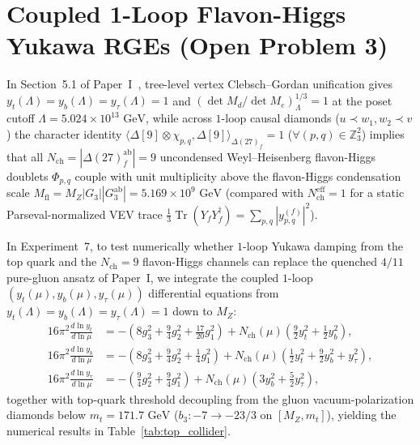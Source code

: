 \documentclass[11pt,a4paper]{article}
\theoremstyle{definition}
\theoremstyle{remark}
\newcommand{\Z}{\mathbb{Z}}
\newcommand{\Tr}{\operatorname{Tr}}
\newcommand{\Gthree}{G_3}
\begin{document}
\section{Coupled 1-Loop Flavon-Higgs Yukawa RGEs (Open Problem 3)}
\label{sec:top_collider}

In Section~5.1 of Paper~I~\cite{PaperI}, tree-level vertex Clebsch--Gordan unification gives $y_t(\Lambda) = y_b(\Lambda) = y_\tau(\Lambda) = 1$ and $(\det M_d/\det M_e)_\Lambda^{1/3} = 1$ at the poset cutoff $\Lambda = 5.024 \times 10^{13}\text{ GeV}$, while across $1$-loop causal diamonds ($u \prec w_1, w_2 \prec v$) the character identity $\langle \Delta[9] \otimes \chi_{p,q}, \Delta[9]\rangle_{\Delta(27)_f} = 1$ ($\forall (p, q) \in \Z_3^2$) implies that all $N_{\mathrm{ch}} = |\Delta(27)_f^{\mathrm{ab}}| = 9$ uncondensed Weyl--Heisenberg flavon-Higgs doublets $\Phi_{p,q}$ couple with unit multiplicity above the flavon-Higgs condensation scale $M_{\mathrm{fl}} = M_Z |\Gthree| |\Gthree^{\mathrm{ab}}| = 5.169 \times 10^9\text{ GeV}$ (compared with $N_{\mathrm{ch}}^{\mathrm{eff}} = 1$ for a static Parseval-normalized VEV trace $\frac{1}{3}\Tr(Y_f Y_f^\dagger) = \sum_{p,q}|y_{p,q}^{(f)}|^2$).

In Experiment~7, to test numerically whether $1$-loop Yukawa damping from the top quark and the $N_{\mathrm{ch}} = 9$ flavon-Higgs channels can replace the quenched $4/11$ pure-gluon ansatz of Paper~I, we integrate the coupled $1$-loop $(y_t(\mu), y_b(\mu), y_\tau(\mu))$ differential equations from $y_t(\Lambda) = y_b(\Lambda) = y_\tau(\Lambda) = 1$ down to $M_Z$:
\begin{equation}
\label{eq:rde_9channel_rge}
\begin{aligned}
16\pi^2 \frac{d\ln y_t}{d\ln\mu} &= -\!\left(8g_3^2 + \frac{9}{4}g_2^2 + \frac{17}{20}g_1^2\right) + N_{\mathrm{ch}}(\mu)\!\left(\frac{9}{2}y_t^2 + \frac{1}{2}y_b^2\right), \\
16\pi^2 \frac{d\ln y_b}{d\ln\mu} &= -\!\left(8g_3^2 + \frac{9}{4}g_2^2 + \frac{1}{4}g_1^2\right) + N_{\mathrm{ch}}(\mu)\!\left(\frac{1}{2}y_t^2 + \frac{9}{2}y_b^2 + y_\tau^2\right), \\
16\pi^2 \frac{d\ln y_\tau}{d\ln\mu} &= -\!\left(\frac{9}{4}g_2^2 + \frac{9}{4}g_1^2\right) + N_{\mathrm{ch}}(\mu)\!\left(3y_b^2 + \frac{5}{2}y_\tau^2\right),
\end{aligned}
\end{equation}
together with top-quark threshold decoupling from the gluon vacuum-polarization diamonds below $m_t = 171.7\text{ GeV}$ ($b_3 : -7 \to -23/3$ on $[M_Z, m_t]$), yielding the numerical results in Table~\ref{tab:top_collider}.
\end{document}
